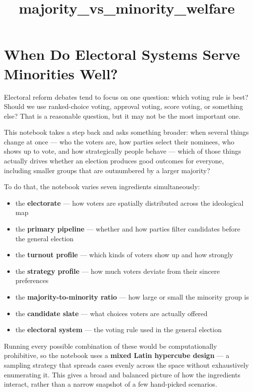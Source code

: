 \documentclass[11pt]{article}
\title{majority\_vs\_minority\_welfare}
\providecommand{\tightlist}{%
      \setlength{\itemsep}{0pt}\setlength{\parskip}{0pt}}
\begin{document}
    
    \maketitle
    
    

    
    \section{When Do Electoral Systems Serve Minorities
Well?}\label{when-do-electoral-systems-serve-minorities-well}

Electoral reform debates tend to focus on one question: which voting
rule is best? Should we use ranked-choice voting, approval voting, score
voting, or something else? That is a reasonable question, but it may not
be the most important one.

This notebook takes a step back and asks something broader: when several
things change at once --- who the voters are, how parties select their
nominees, who shows up to vote, and how strategically people behave ---
which of those things actually drives whether an election produces good
outcomes for everyone, including smaller groups that are outnumbered by
a larger majority?

To do that, the notebook varies seven ingredients simultaneously:

\begin{itemize}
\tightlist
\item
  the \textbf{electorate} --- how voters are spatially distributed
  across the ideological map
\item
  the \textbf{primary pipeline} --- whether and how parties filter
  candidates before the general election
\item
  the \textbf{turnout profile} --- which kinds of voters show up and how
  strongly
\item
  the \textbf{strategy profile} --- how much voters deviate from their
  sincere preferences
\item
  the \textbf{majority-to-minority ratio} --- how large or small the
  minority group is
\item
  the \textbf{candidate slate} --- what choices voters are actually
  offered
\item
  the \textbf{electoral system} --- the voting rule used in the general
  election
\end{itemize}

Running every possible combination of these would be computationally
prohibitive, so the notebook uses a \textbf{mixed Latin hypercube
design} --- a sampling strategy that spreads cases evenly across the
space without exhaustively enumerating it. This gives a broad and
balanced picture of how the ingredients interact, rather than a narrow
snapshot of a few hand-picked scenarios.
\end{document}
